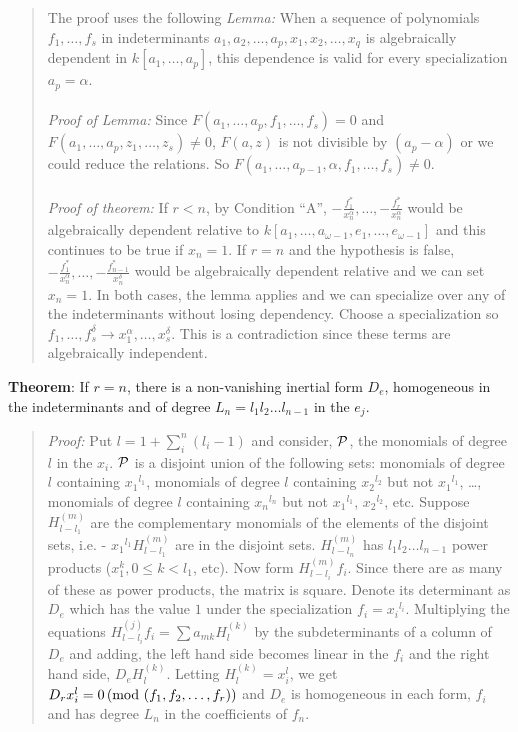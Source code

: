 \begin{quote}
The proof uses the following 
\emph{Lemma:}  When a sequence of polynomials
$f_1, \ldots, f_s$ in indeterminants $a_1 , a_2 , \ldots, a_p, x_1, x_2, \ldots, x_q$
is algebraically dependent in $k[a_1, \ldots, a_p]$, this dependence is valid for
every specialization $a_p=\alpha$.  
\\
\\
\emph{Proof of Lemma:} Since
$F(a_1, \ldots, a_p, f_1, \ldots , f_s)=0$ and
$F(a_1, \ldots, a_p, z_1, \ldots , z_s) \ne 0$, $F(a,z)$ is not divisible by 
$(a_p-\alpha)$ or we could reduce the relations. So
$F(a_1, \ldots, a_{p-1}, \alpha, f_1, \ldots , f_s) \ne 0$.
\\
\\
\emph{Proof of theorem:}
If $r<n$, by Condition ``A'',
$-{\frac {f_1^*} {x_n^{\alpha}}}, \ldots,
-{\frac {f_r^*} {x_n^{\alpha}}}$ would be algebraically dependent relative
to $k[a_1, \ldots, a_{\omega -1}, e_1, \ldots, e_{\omega -1}]$ and this continues to be
true if $x_n = 1$.  If $r=n$ and the hypothesis is false, 
$-{\frac {f_1^*} {x_n^{\alpha}}}, \ldots,
-{\frac {f_{n-1}^*} {x_n^{\delta}}}$ would be algebraically dependent relative and
we can set $x_n=1$.  In both cases, the lemma applies and we can specialize over any of the
indeterminants without losing dependency.  Choose a specialization so
$f_1, \ldots, f_s^{\delta} \rightarrow x_1^{\alpha}, \ldots, x_s^{\delta}$.  This is a
contradiction since these terms are algebraically independent.
\end{quote}
{\bf Theorem}:  If $r=n$, there is a non-vanishing
inertial form $D_e$, homogeneous in the indeterminants and of degree
$L_n= l_1 l_2 \ldots l_{n-1}$ in the $e_j$.  
\begin{quote}
\emph{Proof:}  Put 
$l= 1+ \sum_i^n (l_i -1)$ and consider, ${\cal P}$, the monomials of degree $l$ in the $x_i$.
${\cal P}$ is a disjoint union of the following sets: 
monomials of degree $l$ containing ${x_1}^{l_1}$,
monomials of degree $l$ containing ${x_2}^{l_2}$ but not ${x_1}^{l_1}$, \ldots,
monomials of degree $l$ containing ${x_n}^{l_n}$ but not 
${x_1}^{l_1}$,
${x_2}^{l_2}$, etc.  Suppose $H^{(m)}_{l-l_1}$ are the complementary monomials of
the elements of the disjoint sets, i.e. - 
${x_1}^{l_1}H^{(m)}_{l-l_1}$ are in the disjoint sets.  $H^{(m)}_{l-l_n}$ has
$l_1 l_2 \ldots l_{n-1}$ power products ($x_1^k, 0 \le k < l_1$, etc).  Now form
$H^{(m)}_{l-l_i} f_i$.  Since there are as many of these as power products, the matrix is
square.  Denote its determinant as $D_e$ which has the value $1$ under the specialization
$f_i= {x_i}^{l_i}$.  Multiplying the equations $H^{(j)}_{l-l_i} f_i = \sum a_{mk} H^{(k)}_l$
by the subdeterminants of a column of $D_e$ and adding, the left hand side becomes
linear in the $f_i$ and the right hand side, $D_e H^{(k)}_l$.  Letting
$H^{(k)}_l= x_i^l$, we get $D_rx_i^l = 0 \thinspace \textnormal{(mod } (f_1, f_2, \ldots, f_r) \textnormal{)}$ and $D_e$
is homogeneous in each form, $f_i$ and has degree $L_n$ in the coefficients of $f_n$.
\end{quote}
